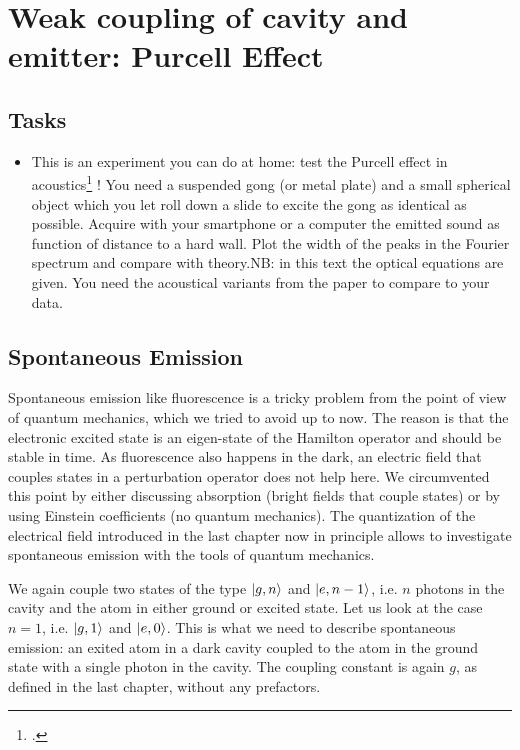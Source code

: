 \renewcommand{\lastmod}{June 3, 2020}


\chapter{Weak coupling of cavity and emitter: Purcell Effect}




\section{Tasks}

\begin{itemize}
\item This is an experiment you can do at home: test the Purcell effect in acoustics\footcite{Langguth16} ! You need a suspended gong (or metal plate) and a small spherical object which you let roll down a slide to excite the gong as identical as possible. Acquire with your smartphone or a computer the  emitted sound as function of distance to a hard wall. Plot the width of the peaks in the Fourier spectrum and compare with theory.\newline  NB: in this text the optical equations are given. You need the acoustical variants from the paper to compare to your data.
\end{itemize}






\section{Spontaneous Emission}
Spontaneous emission like fluorescence is a tricky problem from the point of view of quantum mechanics, which we tried to avoid up to now. The reason is that the electronic excited state is an eigen-state of the Hamilton operator and should be stable in time. As fluorescence also happens in the dark, an electric field that couples states in a perturbation operator does not help here. We circumvented this point by either discussing absorption (bright fields that couple states) or by using Einstein coefficients (no quantum mechanics). The quantization of the electrical field introduced in the last chapter now in principle allows to investigate spontaneous emission with the tools of quantum mechanics.

We again couple two states of the type $\ket{g, n}$ and $\ket{e, n-1}$, i.e. $n$ photons in the cavity and the atom in either ground or excited state. Let us look at the case $n=1$, i.e. $\ket{g, 1}$ and $\ket{e, 0}$. This is what we need to describe spontaneous emission: an exited atom in a dark cavity coupled to the atom in the ground state with a single photon in the cavity. The coupling constant is again $g$, as defined in the last chapter, without any prefactors.


